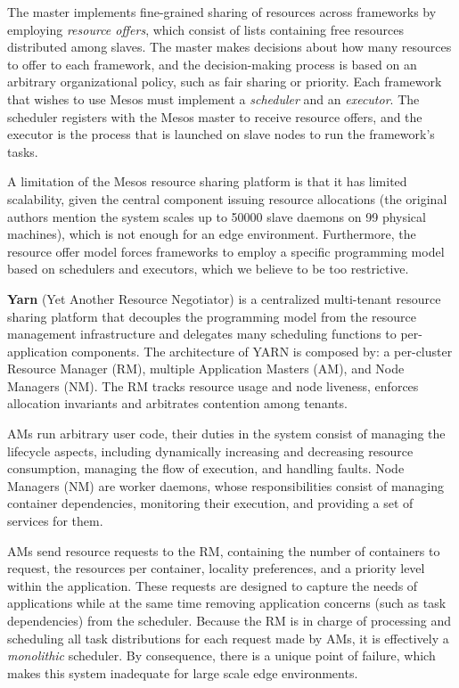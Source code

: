 The master implements fine-grained sharing of resources across frameworks by employing \textit{resource offers}, which consist of lists containing free resources distributed among slaves. The master makes decisions about how many resources to offer to each framework, and the decision-making process is based on an arbitrary organizational policy, such as fair sharing or priority. Each framework that wishes to use Mesos must implement a \textit{scheduler} and an \textit{executor}. The scheduler registers with the Mesos master to receive resource offers, and the executor is the process that is launched on slave nodes to run the framework's tasks.

A limitation of the Mesos resource sharing platform is that it has limited scalability, given the central component issuing resource allocations (the original authors mention the system scales up to 50000 slave daemons on 99 physical machines), which is not enough for an edge environment. Furthermore, the resource offer model forces frameworks to employ a specific programming model based on schedulers and executors, which we believe to be too restrictive.

\textbf{Yarn} (Yet Another Resource Negotiator) \cite{Vavilapalli2013ApacheHY} is a centralized multi-tenant resource sharing platform that decouples the programming model from the resource management infrastructure and delegates many scheduling functions to per-application components. The architecture of YARN is composed by: a per-cluster Resource Manager (RM), multiple Application Masters (AM), and Node Managers (NM). The RM tracks resource usage and node liveness, enforces allocation invariants and arbitrates contention among tenants.

AMs run arbitrary user code, their duties in the system consist of managing the lifecycle aspects, including dynamically increasing and decreasing resource consumption, managing the flow of execution, and handling faults. Node Managers (NM) are worker daemons, whose responsibilities consist of managing container dependencies, monitoring their execution, and providing a set of services for them.

AMs send resource requests to the RM, containing the number of containers to request, the resources per container, locality preferences, and a priority level within the application. These requests are designed to capture the needs of applications while at the same time removing application concerns (such as task dependencies) from the scheduler. Because the RM is in charge of processing and scheduling all task distributions for each request made by AMs, it is effectively a \textit{monolithic} scheduler. By consequence, there is a unique point of failure, which makes this system inadequate for large scale edge environments.

